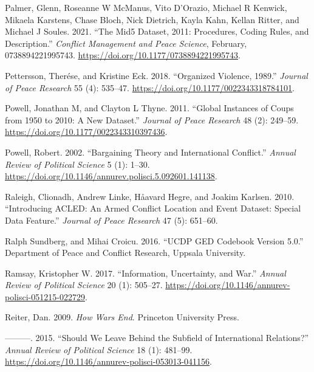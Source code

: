 \documentclass{article}
\newlength{\cslhangindent}
\newlength{\cslentryspacingunit} %
\newenvironment{CSLReferences}[2] %
 {%
  \setlength{\parindent}{0pt}
  \ifodd #1
  \let\oldpar\par
  \def\par{\hangindent=\cslhangindent\oldpar}
  \fi
  \setlength{\parskip}{#2\cslentryspacingunit}
 }%
 {}
\begin{document}
\begin{CSLReferences}{1}{0}
\leavevmode{}%
Palmer, Glenn, Roseanne W McManus, Vito D'Orazio, Michael R Kenwick,
Mikaela Karstens, Chase Bloch, Nick Dietrich, Kayla Kahn, Kellan Ritter,
and Michael J Soules. 2021. {``The {Mid5 Dataset}, 2011:
{Procedures}, Coding Rules, and Description.''} \emph{Conflict
Management and Peace Science}, February, 0738894221995743.
\url{https://doi.org/10.1177/0738894221995743}.

\leavevmode{}%
Pettersson, Therése, and Kristine Eck. 2018. {``Organized Violence,
1989.''} \emph{Journal of Peace Research} 55 (4):
535--47. \url{https://doi.org/10.1177/0022343318784101}.

\leavevmode{}%
Powell, Jonathan M, and Clayton L Thyne. 2011. {``Global Instances of
Coups from 1950 to 2010: {A} New Dataset.''} \emph{Journal of Peace
Research} 48 (2): 249--59.
\url{https://doi.org/10.1177/0022343310397436}.

\leavevmode{}%
Powell, Robert. 2002. {``Bargaining {Theory} and {International
Conflict}.''} \emph{Annual Review of Political Science} 5 (1): 1--30.
\url{https://doi.org/10.1146/annurev.polisci.5.092601.141138}.

\leavevmode{}%
Raleigh, Clionadh, Andrew Linke, Håavard Hegre, and Joakim Karlsen.
2010. {``Introducing {ACLED}: An Armed Conflict Location and Event
Dataset: Special Data Feature.''} \emph{Journal of Peace Research} 47
(5): 651--60.

\leavevmode{}%
Ralph Sundberg, and Mihai Croicu. 2016. {``{UCDP GED Codebook} Version
5.0.''} {Department of Peace and Conflict Research, Uppsala University}.

\leavevmode{}%
Ramsay, Kristopher W. 2017. {``Information, {Uncertainty}, and {War}.''}
\emph{Annual Review of Political Science} 20 (1): 505--27.
\url{https://doi.org/10.1146/annurev-polisci-051215-022729}.

\leavevmode{}%
Reiter, Dan. 2009. \emph{How Wars End}. {Princeton University Press}.

\leavevmode{}%
---------. 2015. {``Should {We Leave Behind} the {Subfield} of
{International Relations}?''} \emph{Annual Review of Political Science}
18 (1): 481--99.
\url{https://doi.org/10.1146/annurev-polisci-053013-041156}.


\end{CSLReferences}
\end{document}
